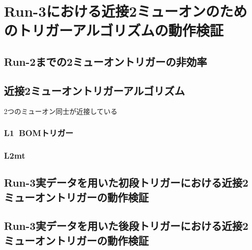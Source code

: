 \chapter{Run-3における近接2ミューオンのためのトリガーアルゴリズムの動作検証}\label{chapter5}

\section{Run-2までの2ミューオントリガーの非効率}\label{5-1}

\section{近接2ミューオントリガーアルゴリズム}\label{5-2}
2つのミューオン同士が近接している

\subsection{L1~BOMトリガー}
\subsection{L2mt}

\section{Run-3実データを用いた初段トリガーにおける近接2ミューオントリガーの動作検証}\label{5-3}

\section{Run-3実データを用いた後段トリガーにおける近接2ミューオントリガーの動作検証}\label{5-4}